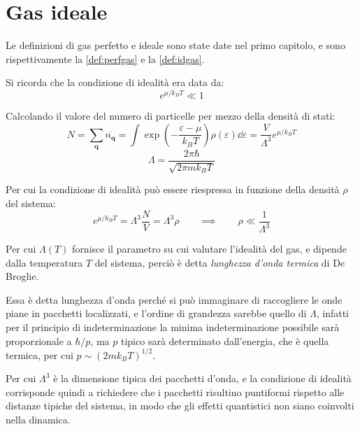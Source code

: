 
\section{Gas ideale}

Le definizioni di gas perfetto e ideale sono state date nel primo capitolo, e sono rispettivamente la \cref{def:perfgas} e la \cref{def:idgas}.

Si ricorda che la condizione di idealità era data da:
\begin{equation*}
e^{\mu/k_B T} \ll 1
\end{equation*}

Calcolando il valore del numero di particelle per mezzo della densità di stati:
\begin{equation*}
N = \sum_{\textbf{q}} \overline{n_{\textbf{q}}} = \int \exp \left(- \frac{\varepsilon - \mu}{k_B T}\right) \rho(\varepsilon) \dd \varepsilon = \frac{V}{\Lambda^3} e^{\mu/k_B T}
\end{equation*}
\begin{equation*}
\Lambda = \frac{2\pi \hbar}{\sqrt{2\pi m k_B T}}
\end{equation*}

Per cui la condizione di idealità può essere riespressa in funzione della densità $\rho$ del sistema:
\begin{equation*}
	e^{\mu/k_B T} = \Lambda^3 \frac{N}{V} = \Lambda^3 \rho	\qquad \implies \qquad \rho \ll \frac{1}{\Lambda^3}
\end{equation*}

Per cui $\Lambda(T)$ fornisce il parametro su cui valutare l'idealità del gas, e dipende dalla temperatura $T$ del sistema, perciò è detta \textit{lunghezza d'onda termica} di De Broglie.

Essa è detta lunghezza d'onda perché si può immaginare di raccogliere le onde piane in pacchetti localizzati, e l'ordine di grandezza sarebbe quello di $\Lambda$, infatti per il principio di indeterminazione la minima indeterminazione possibile sarà proporzionale a $\hbar/p$, ma $p$ tipico sarà determinato dall'energia, che è quella termica, per cui $p \sim (2 m k_B T)^{1/2}$.

Per cui $\Lambda^3$ è la dimensione tipica dei pacchetti d'onda, e la condizione di idealità corrisponde quindi a richiedere che i pacchetti risultino puntiformi rispetto alle distanze tipiche del sistema, in modo che gli effetti quantistici non siano coinvolti nella dinamica.

